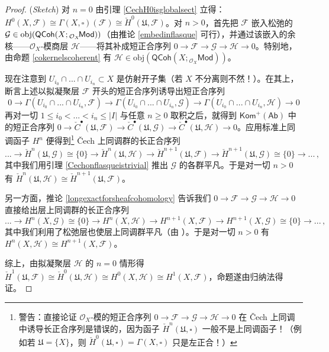 \begin{proof}(\textit{Sketch})
对 $n=0$ 由引理 \ref{CechH0isglobalsect} 立得：$H^0(X,\mathcal{F})\cong\Gamma(X,\square)(\mathcal{F})\cong\check{H}^0(\mathfrak{U},\mathcal{F})$。对 $n>0$，首先把 $\mathcal{F}$ 嵌入松弛的 $\mathcal{G}\in\textup{obj}(\mathsf{QCoh}(X;{}_{\mathcal{O}_X}\!\mathsf{Mod}))$（由推论 \ref{embedinflasque} 可行），并通过该嵌入的余核——$\mathcal{O}_X$-模商层 $\mathcal{H}$——将其补成短正合序列 $0\rightarrow\mathcal{F}\rightarrow\mathcal{G}\rightarrow\mathcal{H}\rightarrow 0$。特别地，由命题 \ref{cokernelscoherent} 有 $\mathcal{H}\in\text{obj}(\mathsf{QCoh}(X;{}_{\mathcal{O}_X}\!\mathsf{Mod}))$。

现在注意到 $U_{i_0}\cap...\cap U_{i_n}\subset X$ 是仿射开子集（若 $X$ 不分离则不然！）。在其上，\cite[Proposition II.5.6]{[Har77]} 断言上述以拟凝聚层 $\mathcal{F}$ 开头的短正合序列诱导出短正合序列
\[
0\rightarrow\Gamma(U_{i_0}\cap...\cap U_{i_n},\mathcal{F})\rightarrow\Gamma(U_{i_0}\cap...\cap U_{i_n},\mathcal{G})\rightarrow\Gamma(U_{i_0}\cap...\cap U_{i_n},\mathcal{H})\rightarrow 0
\]
再对一切 $1\leq i_0<...< i_n\leq|I|$ 与任意 $n\geq 0$ 取积之后，就得到 $\mathsf{Kom^+(Ab)}$ 中的短正合序列 $0\rightarrow\check{C}^\bullet(\mathfrak{U},\mathcal{F})\rightarrow\check{C}^\bullet(\mathfrak{U},\mathcal{G})\rightarrow\check{C}^\bullet(\mathfrak{U},\mathcal{H})\rightarrow 0$。应用标准上同调函子 $H^n$ 便得到\footnote{警告：直接论证 $\mathcal{O}_X$-模的短正合序列 $0\rightarrow\mathcal{F}\rightarrow\mathcal{G}\rightarrow\mathcal{H}\rightarrow 0$ 在 \v{C}ech 上同调中诱导长正合序列是错误的，因为函子 $\check{H}^n(\mathfrak{U},\square)$ 一般不是上同调函子！（例如若 $\mathfrak{U}=\{X\}$，则 $\check{H}^0(\mathfrak{U},\square)=\Gamma(X,\square)$ 只是左正合！）} \v{C}ech 上同调群的长正合序列
\[
...\rightarrow\check{H}^n(\mathfrak{U},\mathcal{G})\cong\{0\}\rightarrow\check{H}^n(\mathfrak{U},\mathcal{H})\rightarrow \check{H}^{n+1}(\mathfrak{U},\mathcal{F})\rightarrow \check{H}^{n+1}(\mathfrak{U},\mathcal{G})\cong\{0\}\rightarrow...\,,
\]
其中我们用引理 \ref{Cechonflasqueistrivial} 推出 $\mathcal{G}$ 的各群平凡。于是对一切 $n>0$ 有 $\check{H}^n(\mathfrak{U},\mathcal{H})\cong \check{H}^{n+1}(\mathfrak{U},\mathcal{F})$。

另一方面，推论 \ref{longexactforsheafcohomology} 告诉我们 $0\rightarrow\mathcal{F}\rightarrow\mathcal{G}\rightarrow\mathcal{H}\rightarrow 0$ 直接给出层上同调群的长正合序列
\[
...\rightarrow H^n(X,\mathcal{G})\cong\{0\}\rightarrow H^n(X,\mathcal{H})\rightarrow H^{n+1}(X,\mathcal{F})\rightarrow H^{n+1}(X,\mathcal{G})\cong\{0\}\rightarrow...\,,
\]
其中我们利用了松弛层也使层上同调群平凡（由 \cite[Proposition III.2.5]{[Har77]}）。于是对一切 $n>0$ 有 $H^n(X,\mathcal{H})\cong H^{n+1}(X,\mathcal{F})$。

综上，由拟凝聚层 $\mathcal{H}$ 的 $n=0$ 情形得 $\check{H}^1(\mathfrak{U},\mathcal{F})\cong \check{H}^0(\mathfrak{U},\mathcal{H})\cong H^0(X,\mathcal{H})\cong H^1(X,\mathcal{F})$，命题遂由归纳法得证。
\end{proof}

